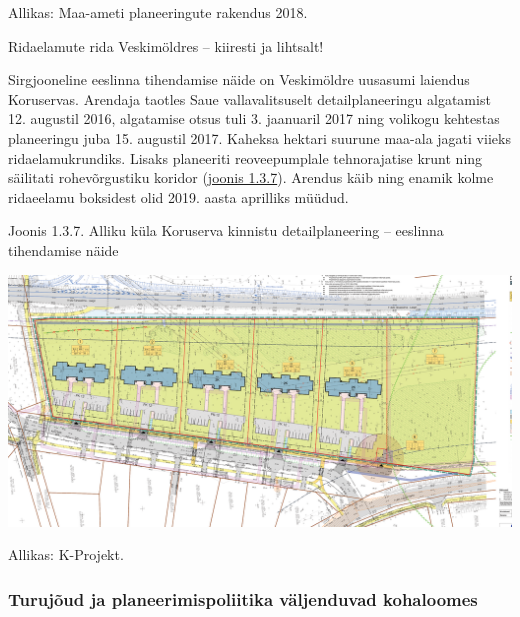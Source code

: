 \documentclass[estonian,]{article}
\begin{document}
\begin{imgsource}
{Allikas:} Maa-ameti planeeringute rakendus 2018.
\end{imgsource}

Ridaelamute rida Veskimöldres -- kiiresti ja lihtsalt!

Sirgjooneline eeslinna tihendamise näide on Veskimöldre uusasumi laiendus Koruservas. Arendaja taotles Saue vallavalitsuselt detailplaneeringu algatamist 12. augustil 2016, algatamise otsus tuli 3. jaanuaril 2017 ning volikogu kehtestas planeeringu juba 15. augustil 2017. Kaheksa hektari suurune maa-ala jagati viieks ridaelamukrundiks. Lisaks planeeriti reoveepumplale tehnorajatise krunt ning säilitati rohevõrgustiku koridor (\protect\hyperlink{figure137}{joonis 1.3.7}). Arendus käib ning enamik kolme ridaeelamu boksidest olid 2019. aasta aprilliks müüdud.

{Joonis 1.3.7.} Alliku küla Koruserva kinnistu detailplaneering -- eeslinna tihendamise näide

\begin{center}\includegraphics[width=0.9\linewidth]{figures/1-chapter/fig137} \end{center}

\begin{imgsource}
{Allikas:} K-Projekt.
\end{imgsource}

\hypertarget{turujuxf5ud-ja-planeerimispoliitika-vuxe4ljenduvad-kohaloomes}{%
\subsubsection*{Turujõud ja planeerimispoliitika väljenduvad kohaloomes}\label{turujuxf5ud-ja-planeerimispoliitika-vuxe4ljenduvad-kohaloomes}}
\end{document}
